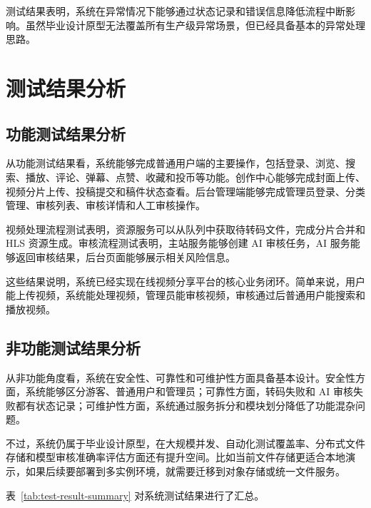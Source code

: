 测试结果表明，系统在异常情况下能够通过状态记录和错误信息降低流程中断影响。虽然毕业设计原型无法覆盖所有生产级异常场景，但已经具备基本的异常处理思路。

\section{测试结果分析}
\label{sec:test-result-analysis}

\subsection{功能测试结果分析}
\label{subsec:function-test-result}

从功能测试结果看，系统能够完成普通用户端的主要操作，包括登录、浏览、搜索、播放、评论、弹幕、点赞、收藏和投币等功能。创作中心能够完成封面上传、视频分片上传、投稿提交和稿件状态查看。后台管理端能够完成管理员登录、分类管理、审核列表、审核详情和人工审核操作。

视频处理流程测试表明，资源服务可以从队列中获取待转码文件，完成分片合并和 HLS 资源生成。审核流程测试表明，主站服务能够创建 AI 审核任务，AI 服务能够返回审核结果，后台页面能够展示相关风险信息。

这些结果说明，系统已经实现在线视频分享平台的核心业务闭环。简单来说，用户能上传视频，系统能处理视频，管理员能审核视频，审核通过后普通用户能搜索和播放视频。

\subsection{非功能测试结果分析}
\label{subsec:nonfunction-test-result}

从非功能角度看，系统在安全性、可靠性和可维护性方面具备基本设计。安全性方面，系统能够区分游客、普通用户和管理员；可靠性方面，转码失败和 AI 审核失败都有状态记录；可维护性方面，系统通过服务拆分和模块划分降低了功能混杂问题。

不过，系统仍属于毕业设计原型，在大规模并发、自动化测试覆盖率、分布式文件存储和模型审核准确率评估方面还有提升空间。比如当前文件存储更适合本地演示，如果后续要部署到多实例环境，就需要迁移到对象存储或统一文件服务。

表~\ref{tab:test-result-summary} 对系统测试结果进行了汇总。

